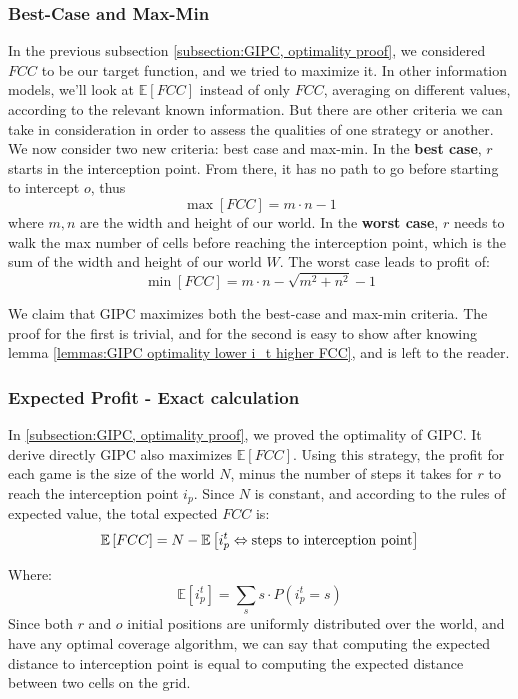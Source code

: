 \documentclass[a4paper,10pt]{article}
\newcommand\rob{\ensuremath{r}\xspace}
\newcommand\opp{\ensuremath{o}\xspace}
\newcommand{\w}{\ensuremath{W}\xspace}
\newcommand{\fcc}{\ensuremath{FCC}\xspace}
\begin{document}
\subsubsection{Best-Case and Max-Min}
In the previous subsection \ref{subsection:GIPC, optimality proof}, we considered \fcc to be our target function, and we tried to maximize it. In other information models, we'll look at $\mathbb{E}[\fcc]$ instead of only \fcc, averaging on different values, according to the relevant known information.
But there are other criteria we can take in consideration in order to assess the qualities of one strategy or another.
We now consider two new criteria: best case and max-min.
In the \textbf{best case}, \rob starts in the interception point. From there, it has no path to go before starting to intercept \opp, thus \[\max[\fcc] = m\cdot n-1\] where $m,n$ are the width and height of our world.
In the \textbf{worst case}, \rob needs to walk the max number of cells before reaching the interception point, which is the sum of the width and height of our world \w. The worst case leads to profit of: \[\min[\fcc] = m\cdot n - \sqrt{m^2 + n^2} - 1\]

We claim that GIPC maximizes both the best-case and max-min criteria. The proof for the first is trivial, and for the second is easy to show after knowing lemma \ref{lemmas:GIPC optimality lower i_t higher FCC}, and is left to the reader.


\subsubsection{Expected Profit - Exact calculation}
In \ref{subsection:GIPC, optimality proof}, we proved the optimality of GIPC. It derive directly GIPC also maximizes $\mathbb{E}[\fcc]$. Using this strategy, the profit for each game is the size of the world $N$, minus the number of steps it takes for \rob to reach the interception point $i_p$.
Since $N$ is constant, and according to the rules of expected value, the total expected \fcc is: \[\mathbb{E}\left[\fcc\right]=N-\mathbb{E}\left[i_p^t \Leftrightarrow\textnormal{steps to interception point}\right]\]

Where: \[\mathbb{E}\left[i_p^t\right]=\sum_{s}{s\cdot P\left(i_p^t=s\right)}\]
Since both \rob and \opp initial positions are uniformly distributed over the world, and have any optimal coverage algorithm, we can say that computing the expected distance to interception point is equal to computing the expected distance between two cells on the grid.
\end{document}
